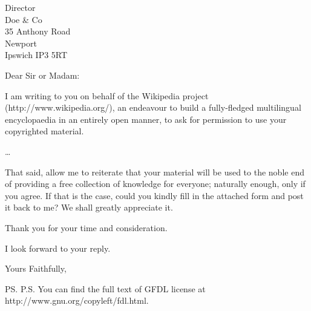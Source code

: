 \documentclass{letter}
\begin{document}
 
\begin{letter}{Director \\ Doe \& Co \\ 35 Anthony Road
\\ Newport \\ Ipswich IP3 5RT}
\opening{Dear Sir or Madam:}
 
I am writing to you on behalf of the Wikipedia project (http://www.wikipedia.org/),
an endeavour to build a fully-fledged multilingual encyclopaedia in an entirely
open manner, to ask for permission to use your copyrighted material.
 
\ldots 
 
That said, allow me to reiterate that your material will be used to the noble end of
providing a free collection of knowledge for everyone; naturally enough, only if you
agree. If that is the case, could you kindly fill in the attached form and post it
back to me? We shall greatly appreciate it.
 
Thank you for your time and consideration.
 
I look forward to your reply.

\closing{Yours Faithfully,}

\ps{P.S. You can find the full text of GFDL license at
http://www.gnu.org/copyleft/fdl.html.}
 
\end{letter}
\end{document}

